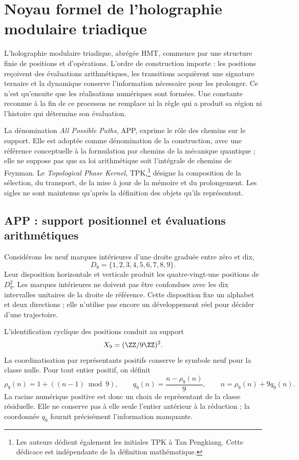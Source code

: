 \section{Noyau formel de l'holographie modulaire triadique}
\label{sec:nucleo}

L'holographie modulaire triadique, abrégée HMT, commence par une structure finie de positions et d'opérations. L'ordre de construction importe : les positions reçoivent des évaluations arithmétiques, les transitions acquièrent une signature ternaire et la dynamique conserve l'information nécessaire pour les prolonger. Ce n'est qu'ensuite que les réalisations numériques sont formées. Une constante reconnue à la fin de ce processus ne remplace ni la règle qui a produit sa région ni l'histoire qui détermine son évaluation.

La dénomination \emph{All Possible Paths}, APP, exprime le rôle des chemins sur le support. Elle est adoptée comme dénomination de la construction, avec une référence conceptuelle à la formulation par chemins de la mécanique quantique ; elle ne suppose pas que sa loi arithmétique soit l'intégrale de chemins de Feynman. Le \emph{Topological Phase Kernel}, TPK,\footnote{Les auteurs dédient également les initiales TPK à Tan Pengkiang. Cette dédicace est indépendante de la définition mathématique.} désigne la composition de la sélection, du transport, de la mise à jour de la mémoire et du prolongement. Les sigles ne sont maintenus qu'après la définition des objets qu'ils représentent.

\subsection{APP : support positionnel et évaluations arithmétiques}

Considérons les neuf marques intérieures d'une droite graduée entre zéro et dix,
\[
 D_9=\{1,2,3,4,5,6,7,8,9\}.
\]
Leur disposition horizontale et verticale produit les quatre-vingt-une positions de \(D_9^2\). Les marques intérieures ne doivent pas être confondues avec les dix intervalles unitaires de la droite de référence. Cette disposition fixe un alphabet et deux directions ; elle n'utilise pas encore un développement réel pour décider d'une trajectoire.

L'identification cyclique des positions conduit au support
\[
 X_9=(\ZZ/9\ZZ)^2.
\]
La coordinatisation par représentants positifs conserve le symbole neuf pour la classe nulle. Pour tout entier positif, on définit
\begin{equation}
 \rho_9(n)=1+((n-1)\bmod9),\qquad
 q_9(n)=\frac{n-\rho_9(n)}9,
 \qquad n=\rho_9(n)+9q_9(n).
 \label{eq:residuo-cociente}
\end{equation}
La racine numérique positive est donc un choix de représentant de la classe résiduelle. Elle ne conserve pas à elle seule l'entier antérieur à la réduction ; la coordonnée \(q_9\) fournit précisément l'information manquante.

